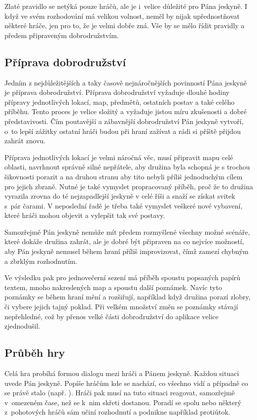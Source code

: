 \documentclass[thesis=B,czech]{resources/FITthesis}[2012/06/26]
\begin{document}
Zlaté pravidlo se netýká pouze hráčů, ale je i~velice důležité pro Pána jeskyně. I když ve svém rozhodování má velikou volnost, neměl by nijak upřednostňovat některé hráče, jen pro to, že je velmi dobře zná. Vše by se mělo řídit pravidly a předem připraveným dobrodružstvím. 


	\subsection{Příprava dobrodružství}
Jedním z nejdůležitějších a taky časově nejnáročnějších povinností Pána jeskyně je příprava dobrodružství. Příprava dobrodružství vyžaduje dlouhé hodiny přípravy jednotlivých lokací, map, předmětů, ostatních postav a také celého příběhu. Tento proces je velice složitý a vyžaduje jistou míru zkušenosti a dobré představivosti. Čím poutavější a zábavnější dobrodružství Pán jeskyně vytvoří, o~to lepší zážitky ostatní hráči budou při hraní zažívat a rádi si příště přijdou zahrát znovu. \par

Příprava jednotlivých lokací je velmi náročná věc, musí připravit mapu celé oblasti, navrhnout správně silné nepřátele, aby družina byla schopná je s trochou šikovnosti porazit a na druhou stranu aby tito nebyli příliš jednoduchým cílem pro jejich zbraně. Nutné je také vymyslet propracovaný příběh, proč že to družina vyrazila zrovna do té nejzapadlejší jeskyně v celé říši a snaží se získat svitek s~pár čarami. V neposlední řadě je třeba také vymyslet veškeré nové vybavení, které hráči mohou objevit a vylepšit tak své postavy. \par

Samozřejmě Pán jeskyně nemůže mít předem rozmyšlené všechny možné scénáře, které dokáže družina zahrát, ale je dobré být připraven na co nejvíce možností, aby Pán jeskyně nemusel během hraní příliš improvizovat, čímž zamezí chybným a zbrklým rozhodnutím. \par

Ve výsledku pak pro jednovečerní sezení má příběh spoustu popsaných papírů textem, mnoho nakreslených map a spoustu další poznámek. Navíc tyto poznámky se během hraní mění a rozšiřují, například když družina porazí zlobry, či vybere jejich tajný poklad. Při velkém množství změn se poznámky stávají nepřehledné, což by přenos velké části dobrodružství do aplikace velice zjednodušil. 
	
	\subsection{Průběh hry}
Celá hra probíhá formou dialogu mezi hráči a Pánem jeskyně. Každou situaci uvede Pán jeskyně. Popíše hráčům kde se nachází, co všechno vidí a případně co se právě stalo (např. ). Hráči pak musí na tuto situaci reagovat, samozřejmě v~omezeném čase, než se k~nim skřeti dostanou. Poradí se spolu nebo některý z~pohotových hráčů sám učiní rozhodnutí a podnikne například protiútok. \par
\end{document}
